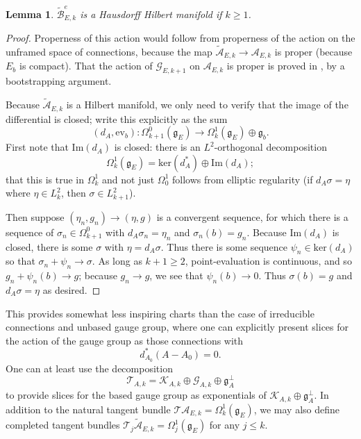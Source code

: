 \documentclass{memo-l}
\newtheorem{lemma}[theorem]{Lemma}
\theoremstyle{definition}
\theoremstyle{remark}
\numberwithin{section}{chapter}
\numberwithin{equation}{chapter}
\begin{document}
\begin{lemma}$\widetilde{\mathcal B}^e_{E,k}$ is a Hausdorff Hilbert manifold if $k \geq 1$.
\end{lemma}

\begin{proof}Properness of this action would follow from properness of the action on the unframed space of connections, because the map $\widetilde{\mathcal A}_{E,k} \to \mathcal A_{E,k}$ is proper (because $E_b$ is compact). That the action of $\mathcal G_{E,k+1}$ on $\mathcal A_{E,k}$ is proper is proved in \cite[Section~2.3.7]{DK}, by a bootstrapping argument. 

Because $\widetilde{\mathcal A}_{E,k}$ is a Hilbert manifold, we only need to verify that the image of the differential is closed; write this explicitly as the sum 
$$(d_A, \text{ev}_b): \Omega^0_{k+1}(\mathfrak g_E) \to \Omega^1_k(\mathfrak g_E) \oplus \mathfrak g_b.$$ 
First note that $\text{Im}(d_A)$ is closed: there is an $L^2$-orthogonal decomposition 
$$\Omega^1_k(\mathfrak g_E) = \text{ker}(d_A^*) \oplus \text{Im}(d_A);$$ 
that this is true in $\Omega^1_k$ and not just $\Omega^1_0$ follows from elliptic regularity (if $d_A \sigma = \eta$ where $\eta \in L^2_k$, then $\sigma \in L^2_{k+1}$).

Then suppose $(\eta_n, g_n) \to (\eta, g)$ is a convergent sequence, for which there is a sequence of $\sigma_n \in \Omega^0_{k+1}$ with $d_A \sigma_n = \eta_n$ and $\sigma_n(b) = g_n$. Because $\text{Im}(d_A)$ is closed, there is some $\sigma$ with $\eta = d_A \sigma$. Thus there is some sequence $\psi_n \in \text{ker}(d_A)$ so that $\sigma_n + \psi_n \to \sigma$. As long as $k+1 \geq 2$, point-evaluation is continuous, and so $g_n + \psi_n(b) \to g$; because $g_n \to g$, we see that $\psi_n(b) \to 0$. Thus $\sigma(b) = g$ and $d_A \sigma = \eta$ as desired.
\end{proof}

This provides somewhat less inspiring charts than the case of irreducible connections and unbased gauge group, where one can explicitly present slices for the action of the gauge group as those connections with 
$$d^*_{A_0}(A-A_0) = 0.$$ 
One can at least use the decomposition 
$$\mathcal T_{A,k} = \mathcal K_{A,k} \oplus \mathcal G_{A,k} \oplus \mathfrak g_A^\perp$$
to provide slices for the based gauge group as exponentials of $\mathcal K_{A,k} \oplus \mathfrak g_A^\perp$. In addition to the natural tangent bundle $\mathcal T\mathcal A_{E,k} = \Omega^1_k(\mathfrak g_E)$, we may also define completed tangent bundles $\mathcal T_j \widetilde{\mathcal A}_{E,k} = \Omega^1_j(\mathfrak g_E)$ for any $j \leq k$.
\end{document}
